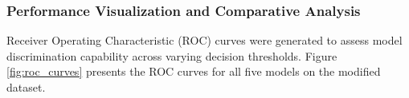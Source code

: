 \documentclass[final,5p, twocolumn]{elsarticle}
\begin{document}
\begin{table}[htbp]
\centering
\caption{\textcolor{blue}{Training time, per-sample inference latency, and serialized model size, measured on the environment of Section~\ref{sec:experimental_environment}. The OR-logic ensemble cost is the sum of its five base learners.}}
\label{tab:cost}
\end{table}

\subsubsection{Performance Visualization and Comparative Analysis}

Receiver Operating Characteristic (ROC) curves were generated to assess model discrimination capability across varying decision thresholds. Figure \ref{fig:roc_curves} presents the ROC curves for all five models on the modified dataset.
\end{document}
